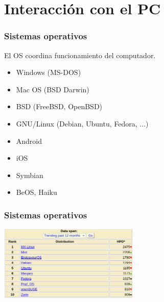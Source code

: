\documentclass[14pt,aspectratio=169,xcolor=dvipsnames]{beamer}
\begin{document}
\section{Interacción con el PC}
\begin{frame}\frametitle{Sistemas operativos}
El OS coordina funcionamiento del computador. \pause
    \begin{itemize}
        \item<+-> Windows (MS-DOS)
        \item<+-> Mac OS (BSD Darwin)
        \item<+-> BSD (FreeBSD, OpenBSD)
        \item<+-> GNU/Linux (Debian, Ubuntu, Fedora, $\hdots$)
        \item<+-> Android
        \item<+-> iOS
        \item<+-> Symbian
        \item<+-> BeOS, Haiku
    \end{itemize}
\end{frame}
\begin{frame}\frametitle{Sistemas operativos}
    \begin{center}
        \includegraphics[width=0.5\textwidth]{../images/distrowatch.png}
    \end{center}
\end{frame}
\end{document}
